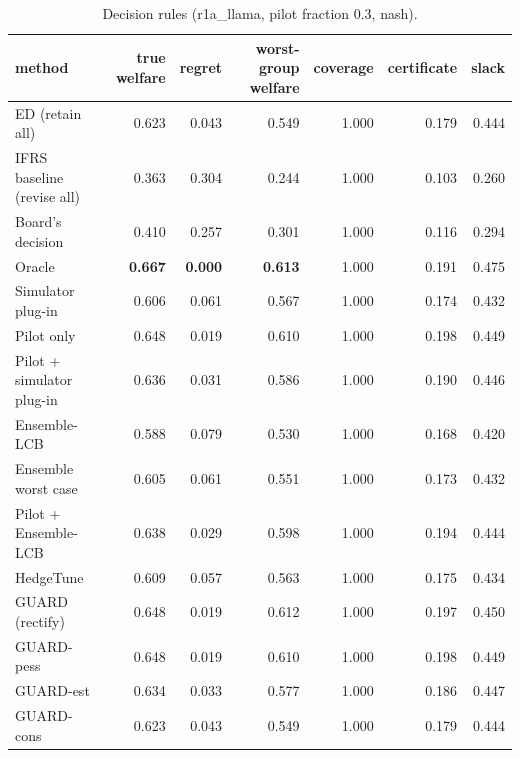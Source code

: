 \begin{table}[t]
\centering
\small
\begin{tabular}{lrrrrrr}
\toprule
method & true welfare & regret & worst-group welfare & coverage & certificate & slack \\
\midrule
ED (retain all) & 0.623 & 0.043 & 0.549 & 1.000 & 0.179 & 0.444 \\
IFRS baseline (revise all) & 0.363 & 0.304 & 0.244 & 1.000 & 0.103 & 0.260 \\
Board's decision & 0.410 & 0.257 & 0.301 & 1.000 & 0.116 & 0.294 \\
Oracle & \textbf{0.667} & \textbf{0.000} & \textbf{0.613} & 1.000 & 0.191 & 0.475 \\
Simulator plug-in & 0.606 & 0.061 & 0.567 & 1.000 & 0.174 & 0.432 \\
Pilot only & 0.648 & 0.019 & 0.610 & 1.000 & 0.198 & 0.449 \\
Pilot + simulator plug-in & 0.636 & 0.031 & 0.586 & 1.000 & 0.190 & 0.446 \\
Ensemble-LCB & 0.588 & 0.079 & 0.530 & 1.000 & 0.168 & 0.420 \\
Ensemble worst case & 0.605 & 0.061 & 0.551 & 1.000 & 0.173 & 0.432 \\
Pilot + Ensemble-LCB & 0.638 & 0.029 & 0.598 & 1.000 & 0.194 & 0.444 \\
HedgeTune & 0.609 & 0.057 & 0.563 & 1.000 & 0.175 & 0.434 \\
GUARD (rectify) & 0.648 & 0.019 & 0.612 & 1.000 & 0.197 & 0.450 \\
GUARD-pess & 0.648 & 0.019 & 0.610 & 1.000 & 0.198 & 0.449 \\
GUARD-est & 0.634 & 0.033 & 0.577 & 1.000 & 0.186 & 0.447 \\
GUARD-cons & 0.623 & 0.043 & 0.549 & 1.000 & 0.179 & 0.444 \\
\bottomrule
\end{tabular}
\caption{Decision rules (r1a\_llama, pilot fraction 0.3, nash).}
\label{tab:methods-nash}
\end{table}

